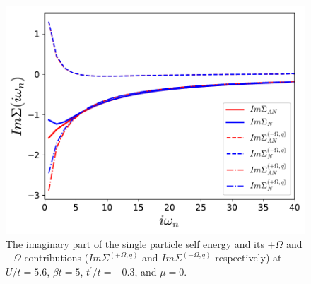 \documentclass[twocolumn,notitlepage,prb,superscriptaddress,showpacs]{revtex4-1}
\begin{document}
\begin{figure}
\centering
       \includegraphics[width=0.95\linewidth]{self_energy.pdf}
        \caption{\label{fig:posnegbose} The imaginary part of the single particle self energy and its  $+\Omega$ and $-\Omega$ contributions ($Im\Sigma^{(+\Omega,q)}$ and $Im\Sigma^{(-\Omega,q)}$ respectively) at $U/t=5.6$, $\beta t =5$, $t^\prime /t=-0.3$, and $\mu=0$. }
\end{figure}
\end{document}
